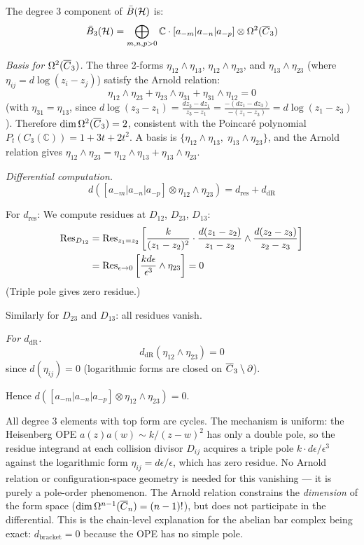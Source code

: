 \begin{computation}\label{comp:heisenberg-deg3-full}
The degree 3 component of $\bar{B}(\mathcal{H})$ is:
\[
\bar{B}_3(\mathcal{H}) = \bigoplus_{m,n,p > 0} \mathbb{C} \cdot [a_{-m}|a_{-n}|a_{-p}] \otimes \Omega^2(\overline{C}_3)
\]

\emph{Basis for $\Omega^2(\overline{C}_3)$.}
The three 2-forms $\eta_{12} \wedge \eta_{13}$, $\eta_{12} \wedge \eta_{23}$, and $\eta_{13} \wedge \eta_{23}$ (where $\eta_{ij} = d\log(z_i - z_j)$) satisfy the Arnold relation:
\[
\eta_{12} \wedge \eta_{23} + \eta_{23} \wedge \eta_{31} + \eta_{31} \wedge \eta_{12} = 0
\]
(with $\eta_{31} = \eta_{13}$, since $d\log(z_3 - z_1) = \frac{dz_3 - dz_1}{z_3 - z_1} = \frac{-(dz_1 - dz_3)}{-(z_1 - z_3)} = d\log(z_1 - z_3)$).  Therefore $\dim \Omega^2(\overline{C}_3) = 2$, consistent with the Poincar\'{e} polynomial $P_t(C_3(\mathbb{C})) = 1 + 3t + 2t^2$.  A basis is $\{\eta_{12} \wedge \eta_{13},\; \eta_{13} \wedge \eta_{23}\}$, and the Arnold relation gives $\eta_{12} \wedge \eta_{23} = \eta_{12} \wedge \eta_{13} + \eta_{13} \wedge \eta_{23}$.

\emph{Differential computation.}
\[
d([a_{-m}|a_{-n}|a_{-p}] \otimes \eta_{12} \wedge \eta_{23}) = d_{\text{res}} + d_{\text{dR}}
\]

For $d_{\text{res}}$: We compute residues at $D_{12}$, $D_{23}$, $D_{13}$:
\begin{align*}
\operatorname{Res}_{D_{12}} &= \operatorname{Res}_{z_1 = z_2}\left[\frac{k}{(z_1-z_2)^2} \cdot \frac{d(z_1-z_2)}{z_1-z_2} \wedge \frac{d(z_2-z_3)}{z_2-z_3}\right] \\
&= \operatorname{Res}_{\epsilon \to 0}\left[\frac{k d\epsilon}{\epsilon^3} \wedge \eta_{23}\right] = 0
\end{align*}
(Triple pole gives zero residue.)

Similarly for $D_{23}$ and $D_{13}$: all residues vanish.

\emph{For $d_{\text{dR}}$.}
\[
d_{\text{dR}}(\eta_{12} \wedge \eta_{23}) = 0
\]
since $d(\eta_{ij}) = 0$ (logarithmic forms are closed on $\overline{C}_3 \setminus \partial$).

Hence $d([a_{-m}|a_{-n}|a_{-p}] \otimes \eta_{12} \wedge \eta_{23}) = 0$.

All degree 3 elements with top form are cycles.
The mechanism is uniform: the Heisenberg OPE $a(z)a(w) \sim k/(z-w)^2$ has only a double pole, so the residue integrand at each collision divisor $D_{ij}$ acquires a triple pole $k \cdot d\epsilon/\epsilon^3$ against the logarithmic form $\eta_{ij} = d\epsilon/\epsilon$, which has zero residue.  No Arnold relation or configuration-space geometry is needed for this vanishing --- it is purely a pole-order phenomenon.  The Arnold relation constrains the \emph{dimension} of the form space ($\dim \Omega^{n-1}(\overline{C}_n) = (n-1)!$), but does not participate in the differential.  This is the chain-level explanation for the abelian bar complex being exact: $d_{\mathrm{bracket}} = 0$ because the OPE has no simple pole.
\end{computation}

